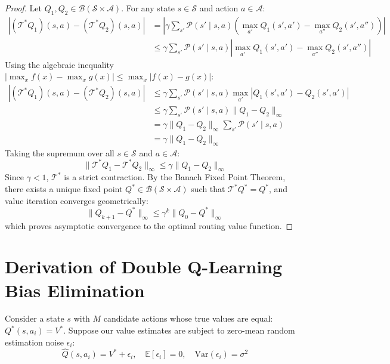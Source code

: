 \begin{proof}
Let $Q_1, Q_2 \in \mathcal{B}(\mathcal{S} \times \mathcal{A})$. For any state $s \in \mathcal{S}$ and action $a \in \mathcal{A}$:
\begin{align}
    |(\mathcal{T}^* Q_1)(s, a) - (\mathcal{T}^* Q_2)(s, a)| &= \left| \gamma \sum_{s'} \mathcal{P}(s' \mid s, a) \left( \max_{a'} Q_1(s', a') - \max_{a''} Q_2(s', a'') \right) \right| \nonumber \\
    &\le \gamma \sum_{s'} \mathcal{P}(s' \mid s, a) \left| \max_{a'} Q_1(s', a') - \max_{a''} Q_2(s', a'') \right|
\end{align}
Using the algebraic inequality $|\max_x f(x) - \max_x g(x)| \le \max_x |f(x) - g(x)|$:
\begin{align}
    |(\mathcal{T}^* Q_1)(s, a) - (\mathcal{T}^* Q_2)(s, a)| &\le \gamma \sum_{s'} \mathcal{P}(s' \mid s, a) \max_{a'} |Q_1(s', a') - Q_2(s', a')| \nonumber \\
    &\le \gamma \sum_{s'} \mathcal{P}(s' \mid s, a) \|Q_1 - Q_2\|_\infty \nonumber \\
    &= \gamma \|Q_1 - Q_2\|_\infty \sum_{s'} \mathcal{P}(s' \mid s, a) \nonumber \\
    &= \gamma \|Q_1 - Q_2\|_\infty
\end{align}
Taking the supremum over all $s \in \mathcal{S}$ and $a \in \mathcal{A}$:
\begin{equation}
    \|\mathcal{T}^* Q_1 - \mathcal{T}^* Q_2\|_\infty \le \gamma \|Q_1 - Q_2\|_\infty
\end{equation}
Since $\gamma < 1$, $\mathcal{T}^*$ is a strict contraction. By the Banach Fixed Point Theorem, there exists a unique fixed point $Q^* \in \mathcal{B}(\mathcal{S} \times \mathcal{A})$ such that $\mathcal{T}^* Q^* = Q^*$, and value iteration converges geometrically:
\begin{equation}
    \|Q_{k+1} - Q^*\|_\infty \le \gamma^k \|Q_0 - Q^*\|_\infty
\end{equation}
which proves asymptotic convergence to the optimal routing value function.
\end{proof}

\section{Derivation of Double Q-Learning Bias Elimination}
Consider a state $s$ with $M$ candidate actions whose true values are equal: $Q^*(s, a_i) = V^*$. Suppose our value estimates are subject to zero-mean random estimation noise $\epsilon_i$:
\begin{equation}
    \hat{Q}(s, a_i) = V^* + \epsilon_i, \quad \mathbb{E}[\epsilon_i] = 0, \quad \text{Var}(\epsilon_i) = \sigma^2
\end{equation}

